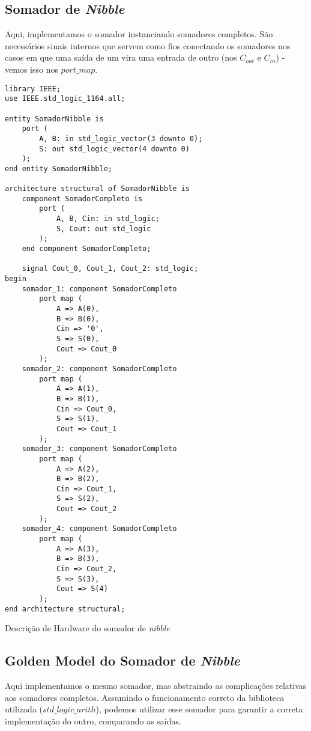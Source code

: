 \documentclass[a4paper,12pt]{article}
\newenvironment{code}{\captionsetup{type=listing}}{}
\begin{document}
\subsection{Somador de \textit{Nibble}}
Aqui, implementamos o somador instanciando somadores completos. São necessários sinais internos que servem como fios conectando os somadores nos casos em que uma saída de um vira uma entrada de outro (nos $C_{out}$ e $C_{in}$) - vemos isso nos $port\_map$.

\begin{code}
    \begin{verbatim}
library IEEE;
use IEEE.std_logic_1164.all;

entity SomadorNibble is
    port (
        A, B: in std_logic_vector(3 downto 0);
        S: out std_logic_vector(4 downto 0)
    );
end entity SomadorNibble;

architecture structural of SomadorNibble is
    component SomadorCompleto is
        port (
            A, B, Cin: in std_logic;
            S, Cout: out std_logic
        );
    end component SomadorCompleto;

    signal Cout_0, Cout_1, Cout_2: std_logic;
begin
    somador_1: component SomadorCompleto
        port map (
            A => A(0),
            B => B(0),
            Cin => '0',
            S => S(0),
            Cout => Cout_0
        );
    somador_2: component SomadorCompleto
        port map (
            A => A(1),
            B => B(1),
            Cin => Cout_0,
            S => S(1),
            Cout => Cout_1
        );
    somador_3: component SomadorCompleto
        port map (
            A => A(2),
            B => B(2),
            Cin => Cout_1,
            S => S(2),
            Cout => Cout_2
        );
    somador_4: component SomadorCompleto
        port map (
            A => A(3),
            B => B(3),
            Cin => Cout_2,
            S => S(3),
            Cout => S(4)
        );
end architecture structural;
    \end{verbatim}
    \caption{Descrição de Hardware do somador de \textit{nibble}}
\end{code}

\subsection{Golden Model do Somador de \textit{Nibble}}
Aqui implementamos o mesmo somador, mas abstraindo as complicações relativas aos somadores completos. Assumindo o funcionamento correto da biblioteca utilizada ($std\_logic\_arith$), podemos utilizar esse somador para garantir a correta implementação do outro, comparando as saídas.
\end{document}
